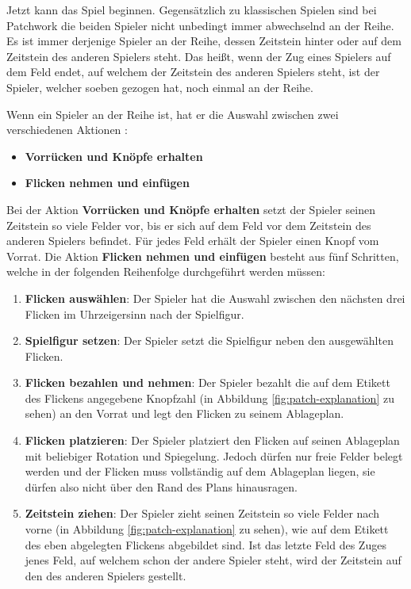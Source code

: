 Jetzt kann das Spiel beginnen. Gegensätzlich zu klassischen Spielen sind bei Patchwork die beiden Spieler nicht unbedingt immer abwechselnd an der Reihe. Es ist immer derjenige Spieler an der Reihe, dessen Zeitstein hinter oder auf dem Zeitstein des anderen Spielers steht. Das heißt, wenn der Zug eines Spielers auf dem Feld endet, auf welchem der Zeitstein des anderen Spielers steht, ist der Spieler, welcher soeben gezogen hat, noch einmal an der Reihe. \cite{2014.PatchworkSpielanleitung}

Wenn ein Spieler an der Reihe ist, hat er die Auswahl zwischen zwei verschiedenen Aktionen :
\begin{itemize}
	\item \textbf{Vorrücken und Knöpfe erhalten} \cite{2014.PatchworkSpielanleitung}
	\item \textbf{Flicken nehmen und einfügen} \cite{2014.PatchworkSpielanleitung}
\end{itemize}

Bei der Aktion \textbf{Vorrücken und Knöpfe erhalten} setzt der Spieler seinen Zeitstein so viele Felder vor, bis er sich auf dem Feld vor dem Zeitstein des anderen Spielers befindet. Für jedes Feld erhält der Spieler einen Knopf vom Vorrat. \cite{2014.PatchworkSpielanleitung}
Die Aktion \textbf{Flicken nehmen und einfügen} besteht aus fünf Schritten, welche in der folgenden Reihenfolge durchgeführt werden müssen:

\begin{enumerate}
\item \textbf{Flicken auswählen}: Der Spieler hat die Auswahl zwischen den nächsten drei Flicken im Uhrzeigersinn nach der Spielfigur. \cite{2014.PatchworkSpielanleitung}
\item \textbf{Spielfigur setzen}: Der Spieler setzt die Spielfigur neben den ausgewählten Flicken. \cite{2014.PatchworkSpielanleitung}
\item \textbf{Flicken bezahlen und nehmen}: Der Spieler bezahlt die auf dem Etikett des Flickens angegebene Knopfzahl (in Abbildung \ref{fig:patch-explanation} zu sehen) an den Vorrat und legt den Flicken zu seinem Ablageplan. \cite{2014.PatchworkSpielanleitung}
\item \textbf{Flicken platzieren}: Der Spieler platziert den Flicken auf seinen Ablageplan mit beliebiger Rotation und Spiegelung. Jedoch dürfen nur freie Felder belegt werden und der Flicken muss vollständig auf dem Ablageplan liegen, sie dürfen also nicht über den Rand des Plans hinausragen. \cite{2014.PatchworkSpielanleitung}
\item \textbf{Zeitstein ziehen}: Der Spieler zieht seinen Zeitstein so viele Felder nach vorne (in Abbildung \ref{fig:patch-explanation} zu sehen), wie auf dem Etikett des eben abgelegten Flickens abgebildet sind. Ist das letzte Feld des Zuges jenes Feld, auf welchem schon der andere Spieler steht, wird der Zeitstein auf den des anderen Spielers gestellt. \cite{2014.PatchworkSpielanleitung}
\end{enumerate}

